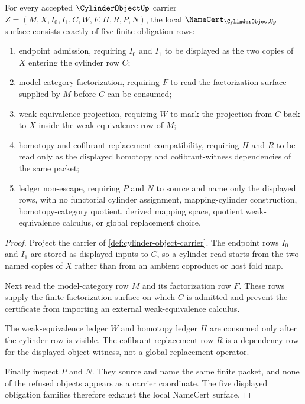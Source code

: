 \begin{theorem}
\label{thm:cylinder-object-namecert-obligations}
For every accepted $\CylinderObjectUp$ carrier $Z=(M,X,I_0,I_1,C,W,F,H,R,P,N)$, the local $\NameCert_{\CylinderObjectUp}$ surface consists exactly of five finite obligation rows:
\begin{enumerate}
\item endpoint admission, requiring $I_0$ and $I_1$ to be displayed as the two copies of $X$ entering the cylinder row $C$;
\item model-category factorization, requiring $F$ to read the factorization surface supplied by $M$ before $C$ can be consumed;
\item weak-equivalence projection, requiring $W$ to mark the projection from $C$ back to $X$ inside the weak-equivalence row of $M$;
\item homotopy and cofibrant-replacement compatibility, requiring $H$ and $R$ to be read only as the displayed homotopy and cofibrant-witness dependencies of the same packet;
\item ledger non-escape, requiring $P$ and $N$ to source and name only the displayed rows, with no functorial cylinder assignment, mapping-cylinder construction, homotopy-category quotient, derived mapping space, quotient weak-equivalence calculus, or global replacement choice.
\end{enumerate}
\end{theorem}
\begin{proof}
Project the carrier of \autoref{def:cylinder-object-carrier}. The endpoint rows $I_0$ and $I_1$ are stored as displayed inputs to $C$, so a cylinder read starts from the two named copies of $X$ rather than from an ambient coproduct or host fold map.

Next read the model-category row $M$ and its factorization row $F$. These rows supply the finite factorization surface on which $C$ is admitted and prevent the certificate from importing an external weak-equivalence calculus.

The weak-equivalence ledger $W$ and homotopy ledger $H$ are consumed only after the cylinder row is visible. The cofibrant-replacement row $R$ is a dependency row for the displayed object witness, not a global replacement operator.

Finally inspect $P$ and $N$. They source and name the same finite packet, and none of the refused objects appears as a carrier coordinate. The five displayed obligation families therefore exhaust the local NameCert surface.
\end{proof}


